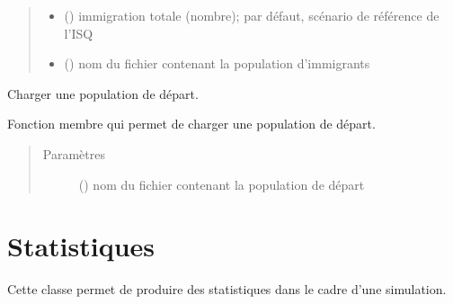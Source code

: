 \documentclass[letterpaper,10pt,french]{sphinxmanual}
\begin{document}
\begin{fulllineitems}
\begin{fulllineitems}
\begin{quote}
\begin{description}
\begin{itemize}
\item {} 
 () \textendash{} immigration totale (nombre); par défaut, scénario de référence de l’ISQ

\item {} 
 () \textendash{} nom du fichier contenant la population d’immigrants

\end{itemize}

\end{description}\end{quote}

\end{fulllineitems}


\begin{fulllineitems}
\label{\detokenize{code:simgen.model.startpop}}
Charger une population de départ.

Fonction membre qui permet de charger une population de départ.
\begin{quote}\begin{description}
\item[{Paramètres}] \leavevmode
{} () \textendash{} nom du fichier contenant la population de départ

\end{description}\end{quote}

\end{fulllineitems}


\end{fulllineitems}



\section{Statistiques}
\label{\detokenize{code:statistiques}}
Cette classe permet de produire des statistiques dans le cadre d’une simulation.
\end{document}
